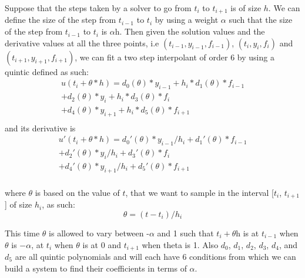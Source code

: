 \documentclass{article}
\begin{document}
Suppose that the steps taken by a solver to go from $t_i$ to $t_{i + 1}$ is of size $h$. We can define the size of the step from $t_{i - 1}$ to $t_i$ by using a weight $\alpha$ such that the size of the step from $t_{i - 1}$ to $t_i$ is $\alpha$h. Then given the solution values and the derivative values at all the three points, i.e $(t_{i-1}, y_{i - 1}, f_{i - 1})$, $(t_i, y_i, f_i)$ and $(t_{i + 1}, y_{i + 1}, f_{i + 1})$, we can fit a two step interpolant of order 6 by using a quintic defined as such:
\begin{equation}
\begin{split}
u(t_i + \theta*h) = d_{0}(\theta)*y_{i-1} +  h_i*d_{1}(\theta)*f_{i-1} \\
+ d_{2}(\theta)*y_i     +  h_i*d_{3}(\theta)*f_i \\
+ d_{4}(\theta)*y_{i + 1} + h_i*d_{5}(\theta)*f_{i + 1} \\
\end{split}
\end{equation}
and its derivative is
\begin{equation}
\begin{split}
u'(t_i + \theta*h) = d_{0}'(\theta)*y_{i-1}/h_i +  d_{1}'(\theta)*f_{i-1} \\
+ d_{2}'(\theta)*y_i/h_i     +  d_{3}'(\theta)*f_i \\
+ d_{4}'(\theta)*y_{i + 1}/h_i + d_{5}'(\theta)*f_{i + 1} \\
\end{split}
\end{equation}

where $\theta$ is based on the value of $t$, that we want to sample in the interval [$t_i$, $t_{i + 1}$] of size $h_i$, as such:
\begin{equation}
\theta = (t - t_i) / h_i
\end{equation}

This time $\theta$ is allowed to vary between -$\alpha$ and 1 such that $t_i + \theta$h is at $t_{i - 1}$ when $\theta$ is $-\alpha$, at $t_i$ when $\theta$ is at 0 and $t_{i + 1}$ when theta is 1. Also $d_0$, $d_1$, $d_2$, $d_3$, $d_4$, and $d_5$ are all quintic polynomials and will each have 6 conditions from which we can build a system to find their coefficients in terms of $\alpha$.
\end{document}
